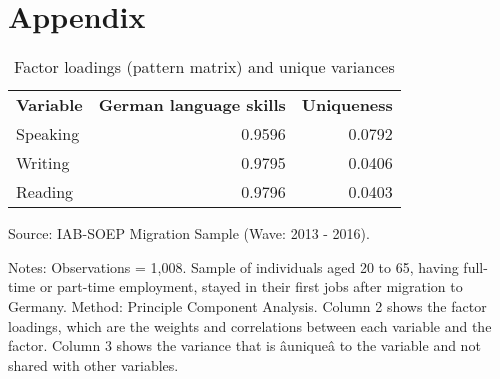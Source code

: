 \documentclass[12pt,a4paper]{article}
\begin{document}
\section{Appendix}

\begin{table}[htbp]
  \centering
  \caption{Factor loadings (pattern matrix) and unique variances}
\begin{center}
    \begin{tabular}{lrr}
    \toprule
    \multicolumn{1}{c}{\textbf{Variable}} & \multicolumn{1}{c}{\textbf{German language skills}} & \multicolumn{1}{c}{\textbf{Uniqueness}} \\
    Speaking & 0.9596 & 0.0792 \\
    Writing & 0.9795 & 0.0406 \\
    Reading & 0.9796 & 0.0403 \\
    \bottomrule
    \end{tabular}%
\end{center}
\begin{tablenotes}
      \small
      \item Source: IAB-SOEP Migration Sample (Wave: 2013 - 2016).
      \item Notes: Observations = 1,008. Sample of individuals aged 20 to 65, having full-time or part-time employment, stayed in their first jobs after migration to Germany.  Method: Principle Component Analysis. Column 2 shows the factor loadings, which are the weights and correlations between each variable and the factor. Column 3 shows  the variance that is âuniqueâ to the variable and not shared with other variables.
    \end{tablenotes}
\end{table}%
\end{document}

